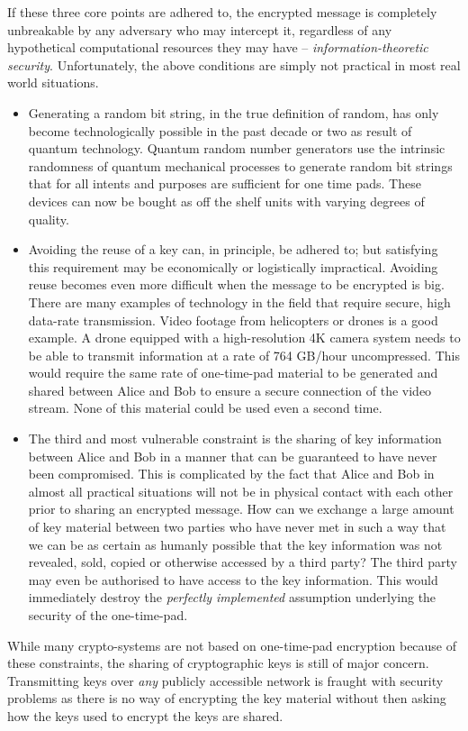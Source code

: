 \documentclass[twocolumn, aps, rmp, amsmath, amssymb, nofootinbib, superscriptaddress, longbibliography, floatfix, table-of-contents, eqsecnum]{revtex4-2}
\begin{document}
If these three core points are adhered to, the encrypted message is completely unbreakable by any adversary who may intercept it, regardless of any hypothetical computational resources they may have -- \textit{information-theoretic security}. Unfortunately, the above conditions are simply not practical in most real world situations. 
\begin{itemize}
\item Generating a random bit string, in the true definition of random, has only become technologically possible in the past decade or two as result of quantum technology. Quantum random number generators use the intrinsic randomness of quantum mechanical processes to generate random bit strings that for all intents and purposes are sufficient for one time pads. These devices can now be bought as off the shelf units with varying degrees of quality. 
\item Avoiding the reuse of a key can, in principle, be adhered to; but satisfying this requirement may be economically or logistically impractical. Avoiding reuse becomes even more difficult when the message to be encrypted is big. There are many examples of technology in the field that require secure, high data-rate transmission. Video footage from helicopters or drones is a good example. A drone equipped with a high-resolution 4K camera system needs to be able to transmit information at a rate of 764 GB/hour uncompressed. This would require the same rate of one-time-pad material to be generated and shared between Alice and Bob to ensure a secure connection of the video stream. None of this material could be used even a second time. 
\item The third and most vulnerable constraint is the sharing of key information between Alice and Bob in a manner that can be guaranteed to have never been compromised. This is complicated by the fact that Alice and Bob in almost all practical situations will not be in physical contact with each other prior to sharing an encrypted message. How can we exchange a large amount of key material between two parties who have never met in such a way that we can be as certain as humanly possible that the key information was not revealed, sold, copied or otherwise accessed by a third party? The third party may even be authorised to have access to the key information. This would immediately destroy the \textit{perfectly implemented} assumption underlying the security of the one-time-pad. 
\end{itemize}

While many crypto-systems are not based on one-time-pad encryption because of these constraints, the sharing of cryptographic keys is still of major concern. Transmitting keys over \textit{any} publicly accessible network is fraught with security problems as there is no way of encrypting the key material without then asking how the keys used to encrypt the keys are shared.
\end{document}
